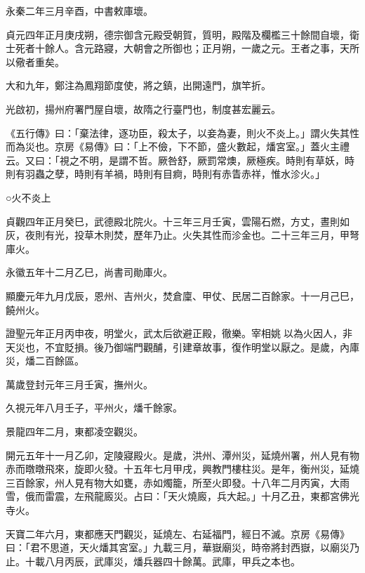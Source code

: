 \begin{pinyinscope}
 永秦二年三月辛酉，中書敕庫壞。



 貞元四年正月庚戌朔，德宗御含元殿受朝賀，質明，殿階及欄檻三十餘間自壞，衛士死者十餘人。含元路寢，大朝會之所御也；正月朔，一歲之元。王者之事，天所以儆者重矣。



 大和九年，鄭注為鳳翔節度使，將之鎮，出開遠門，旗竿折。



 光啟初，揚州府署門屋自壞，故隋之行臺門也，制度甚宏麗云。



 《五行傳》曰：「棄法律，逐功臣，殺太子，以妾為妻，則火不炎上。」謂火失其性而為災也。京房《易傳》曰：「上不儉，下不節，盛火數起，燔宮室。」蓋火主禮云。又曰：「視之不明，是謂不哲。厥咎舒，厥罰常燠，厥極疾。時則有草妖，時則有羽蟲之孽，時則有羊禍，時則有目痾，時則有赤眚赤祥，惟水沴火。」



 ○火不炎上



 貞觀四年正月癸巳，武德殿北院火。十三年三月壬寅，雲陽石燃，方丈，晝則如灰，夜則有光，投草木則焚，歷年乃止。火失其性而沴金也。二十三年三月，甲弩庫火。



 永徽五年十二月乙巳，尚書司勛庫火。



 顯慶元年九月戊辰，恩州、吉州火，焚倉廩、甲仗、民居二百餘家。十一月己巳，饒州火。



 證聖元年正月丙申夜，明堂火，武太后欲避正殿，徹樂。宰相姚以為火因人，非天災也，不宜貶損。後乃御端門觀酺，引建章故事，復作明堂以厭之。是歲，內庫災，燔二百餘區。



 萬歲登封元年三月壬寅，撫州火。



 久視元年八月壬子，平州火，燔千餘家。



 景龍四年二月，東都凌空觀災。



 開元五年十一月乙卯，定陵寢殿火。是歲，洪州、潭州災，延燒州署，州人見有物赤而暾暾飛來，旋即火發。十五年七月甲戌，興教門樓柱災。是年，衡州災，延燒三百餘家，州人見有物大如甕，赤如燭籠，所至火即發。十八年二月丙寅，大雨雪，俄而雷震，左飛龍廄災。占曰：「天火燒廄，兵大起。」十月乙丑，東都宮佛光寺火。



 天寶二年六月，東都應天門觀災，延燒左、右延福門，經日不滅。京房《易傳》曰：「君不思道，天火燔其宮室。」九載三月，華嶽廟災，時帝將封西嶽，以廟災乃止。十載八月丙辰，武庫災，燔兵器四十餘萬。武庫，甲兵之本也。




\end{pinyinscope}
